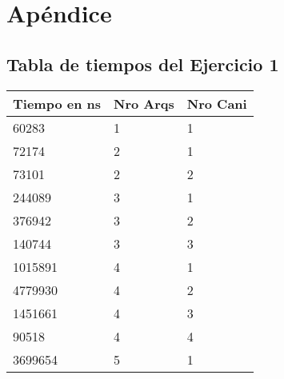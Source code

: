\section{Apéndice}\label{sec:codigo}

\subsection{Tabla de tiempos del Ejercicio 1}

\begin{table}[H]
\centering
\begin{tabular}{lll}
\hline
\multicolumn{1}{|l|}{\textbf{Tiempo en ns}} & \multicolumn{1}{l|}{\textbf{Nro Arqs}} & \multicolumn{1}{l|}{\textbf{Nro Cani}} \\ \hline
60283                                       & 1                                      & 1                                      \\
72174                                       & 2                                      & 1                                      \\
73101                                       & 2                                      & 2                                      \\
244089                                      & 3                                      & 1                                      \\
376942                                      & 3                                      & 2                                      \\
140744                                      & 3                                      & 3                                      \\
1015891                                     & 4                                      & 1                                      \\
4779930                                     & 4                                      & 2                                      \\
1451661                                     & 4                                      & 3                                      \\
90518                                       & 4                                      & 4                                      \\
3699654                                     & 5                                      & 1                                      \\

\end{tabular}
\end{table}
